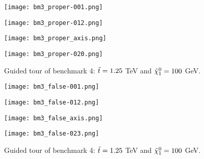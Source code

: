 \begin{figure}[htbp]
\centering
  \begin{minipage}[htbp]{0.49\textwidth}
    \centering
    \texttt{[image: bm3\_proper-001.png]}
  \end{minipage}
  \begin{minipage}[htbp]{0.49\textwidth}
    \centering
    \texttt{[image: bm3\_proper-012.png]}
  \end{minipage}
  \begin{minipage}[htbp]{0.49\textwidth}
    \centering
    \texttt{[image: bm3\_proper\_axis.png]}
  \end{minipage}
  \begin{minipage}[htbp]{0.49\textwidth}
    \centering
    \texttt{[image: bm3\_proper-020.png]}
  \end{minipage}
  \caption{Guided tour of benchmark 4: $\Tilde{t} = 1.25$ TeV and $\Tilde{\chi}_1^0 = 100$ GeV. }
  \label{fig:bm3_tour}
\end{figure}

\begin{figure}[htbp]
\centering
  \begin{minipage}[htbp]{0.49\textwidth}
    \centering
    \texttt{[image: bm3\_false-001.png]}
  \end{minipage}
  \begin{minipage}[htbp]{0.49\textwidth}
    \centering
    \texttt{[image: bm3\_false-012.png]}
  \end{minipage}
  \begin{minipage}[htbp]{0.49\textwidth}
    \centering
    \texttt{[image: bm3\_false\_axis.png]}
  \end{minipage}
  \begin{minipage}[htbp]{0.49\textwidth}
    \centering
    \texttt{[image: bm3\_false-023.png]}
  \end{minipage}
  \caption{Guided tour of benchmark 4: $\Tilde{t} = 1.25$ TeV and $\Tilde{\chi}_1^0 = 100$ GeV. }
  \label{fig:bm3F_tour}
\end{figure}


